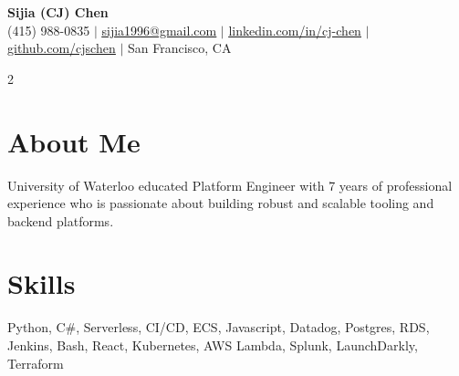 \documentclass[letterpaper,11pt]{article}
\begin{document}

\begin{center}
    \textbf{\Huge Sijia (CJ) Chen} \\ \vspace{1pt}
    \small (415) 988-0835 $|$ \href{mailto:sijia1996@gmail.com}{\underline{sijia1996@gmail.com}} $|$ 
    \href{https://www.linkedin.com/in/cj-chen/}{\underline{linkedin.com/in/cj-chen}} $|$
    \href{https://github.com/cjschen}{\underline{github.com/cjschen}} $|$
    San Francisco, CA
\end{center}

%
 \begin{multicols}{2}
    \section{About Me}
    \small University of Waterloo educated Platform Engineer with 7 years of professional experience who is passionate about building robust and scalable tooling and backend platforms.

    \columnbreak
    \section{Skills}
    
    \small Python, C\#, Serverless, CI/CD, ECS, Javascript, Datadog, Postgres, RDS, Jenkins, Bash, React, Kubernetes, AWS Lambda, Splunk, LaunchDarkly, Terraform



  \end{multicols}
\end{document}

